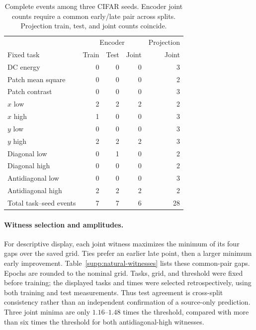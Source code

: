 \begin{table}[t]
\centering\small
\caption{Complete events among three CIFAR seeds. Encoder joint counts require a common early/late pair across splits. Projection train, test, and joint counts coincide.}
\label{supp:natural-task-counts}
\setlength{\tabcolsep}{3pt}
\begin{tabular}{lrrrr}
\toprule
&\multicolumn{3}{c}{Encoder}&Projection\\
Fixed task&Train&Test&Joint&Joint\\\midrule
DC energy&0&0&0&3\\
Patch mean square&0&0&0&2\\
Patch contrast&0&0&0&3\\
$x$ low&2&2&2&2\\
$x$ high&1&0&0&3\\
$y$ low&0&0&0&3\\
$y$ high&2&2&2&3\\
Diagonal low&0&1&0&2\\
Diagonal high&0&0&0&2\\
Antidiagonal low&0&0&0&3\\
Antidiagonal high&2&2&2&2\\\midrule
Total task--seed events&7&7&6&28\\\bottomrule
\end{tabular}
\end{table}

\paragraph{Witness selection and amplitudes.}
For descriptive display, each joint witness maximizes the minimum of its four gaps over the saved grid. Ties prefer an earlier late point, then a larger minimum early improvement. Table~\ref{supp:natural-witnesses} lists these common-pair gaps. Epochs are rounded to the nominal grid. Tasks, grid, and threshold were fixed before training; the displayed tasks and times were selected retrospectively, using both training and test measurements. Thus test agreement is cross-split consistency rather than an independent confirmation of a source-only prediction. Three joint minima are only $1.16$--$1.48$ times the threshold, compared with more than six times the threshold for both antidiagonal-high witnesses.

